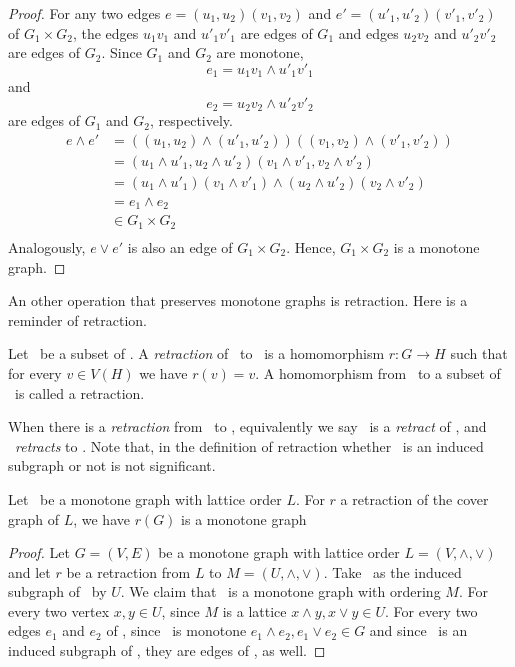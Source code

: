 \begin{proof}
For any two edges \(e = (u_1,u_2)(v_1,v_2)\) and \(e' =(u'_1,u'_2)(v'_1,v'_2)\) of \(G_1\times G_2\),
the edges \(u_1v_1\) and \(u'_1v'_1\) are edges of \(G_1\) and
edges \(u_2v_2\) and \(u'_2v'_2\) are edges of \(G_2\)\@.
Since \(G_1\) and \(G_2\) are monotone,
\[e_1 = u_1v_1 \wedge u'_1v'_1\]
and
\[e_2 = u_2v_2 \wedge u'_2v'_2\]
are edges of \(G_1\) and \(G_2\), respectively.
\begin{align*}
e \wedge e' &= ((u_1,u_2)\wedge(u'_1,u'_2))((v_1,v_2)\wedge(v'_1,v'_2)) \\
&= (u_1\wedge u'_1,u_2 \wedge u'_2)(v_1\wedge v'_1,v_2 \wedge v'_2) \\
&= (u_1\wedge u'_1)(v_1\wedge v'_1) \wedge (u_2\wedge u'_2)(v_2\wedge v'_2) \\
&= e_1 \wedge e_2 \\
&\in G_1 \times G_2 \\
\end{align*}
Analogously, \(e \vee e'\) is also an edge of \(G_1\times G_2\)\@. Hence, \(G_1\times G_2\)
is a monotone graph.
\end{proof}

An other operation that preserves monotone graphs is retraction. Here is a reminder 
of retraction.
\begin{defi} [Retraction]
Let \mH\ be a subset of \mG\@. A \emph{retraction} of \mG\ to \mH\ is a 
homomorphism \(r: G\to H\) such that for every \(v\in V(H)\) we have
\(r(v) = v\)\@.
A homomorphism from \mG\ to a subset of \mG\ is called a retraction.
\end{defi}
When there is a \emph{retraction} from \mH\ to \mG, equivalently we say
\mH\ is a \emph{retract} of \mG, and \mG\ \emph{retracts} to \mH\@.
Note that, in the definition of retraction whether \mH\ is an induced subgraph or not 
is not significant.

\begin{lemma} \label{lem:retract}
Let \mG\ be a monotone graph with lattice order \(L\)\@.
For \(r\) a retraction of the cover graph of \(L\), we have \(r(G)\) is a monotone graph
\end{lemma}

\begin{proof}
Let \(G=(V,E)\) be a monotone graph with lattice order \(L=(V, \wedge,\vee)\) and
let \(r\) be a retraction from \(L\) to \(M =(U, \wedge, \vee)\)\@.
Take \mH\ as the induced subgraph of \mG\ by \(U\)\@.
We claim that \mH\ is a monotone graph with ordering \(M\)\@.
For every two vertex \(x,y\in U\), since \(M\) is a lattice
\(x\wedge y,x\vee y\in U\)\@. For every two edges \(e_1\) and \(e_2\) of
\mH, since \mG\ is monotone \(e_1\wedge e_2,e_1\vee e_2\in G\)
and since \mH\ is an induced subgraph of \mG, they are edges of 
\mH, as well.
\end{proof}

